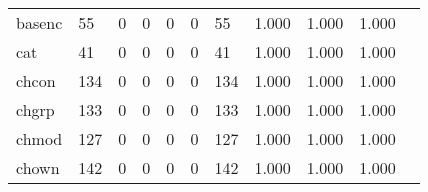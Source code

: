 \begin{longtable}{lp{1.2cm}p{1.2cm}p{1.2cm}p{1.2cm}p{1.2cm}p{1.2cm}p{1.2cm}p{1.2cm}p{1.2cm}p{1.2cm}}
basenc    &                                    55 &                                                  0 &                                                  0 &                                                  0 &                                                  0 &                                                 55 &                                              1.000 &                                              1.000 &                                              1.000 \\
cat       &                                    41 &                                                  0 &                                                  0 &                                                  0 &                                                  0 &                                                 41 &                                              1.000 &                                              1.000 &                                              1.000 \\
chcon     &                                   134 &                                                  0 &                                                  0 &                                                  0 &                                                  0 &                                                134 &                                              1.000 &                                              1.000 &                                              1.000 \\
chgrp     &                                   133 &                                                  0 &                                                  0 &                                                  0 &                                                  0 &                                                133 &                                              1.000 &                                              1.000 &                                              1.000 \\
chmod     &                                   127 &                                                  0 &                                                  0 &                                                  0 &                                                  0 &                                                127 &                                              1.000 &                                              1.000 &                                              1.000 \\
chown     &                                   142 &                                                  0 &                                                  0 &                                                  0 &                                                  0 &                                                142 &                                              1.000 &                                              1.000 &                                              1.000 \\

\end{longtable}

